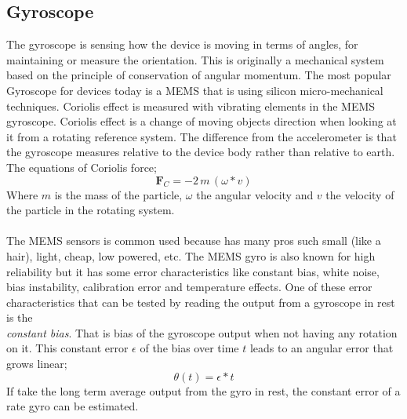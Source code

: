\subsection{Gyroscope}\label{sec:gyroscope}
The gyroscope is sensing how the device is moving in terms of angles, for maintaining or measure the orientation. This is originally  a mechanical system based on the principle of conservation of angular momentum. The most popular Gyroscope for devices today is a MEMS that is using silicon micro-mechanical techniques. Coriolis effect is measured with vibrating elements in the MEMS gyroscope. Coriolis effect is a change of moving objects direction when looking at it from a rotating reference system. The difference from the accelerometer is that the gyroscope measures relative to the device body rather than relative to earth. The equations of Coriolis force;  
$$\boldsymbol{ F}_C = -2 \, m \, (\omega *  v)$$
Where $m$ is the mass of the particle, $\omega$ the angular velocity and $v$ the velocity of the particle in the rotating system. 
\cite{sensor:inertialNav} \\
\\
The MEMS sensors is common used because has many pros such small (like a hair), light, cheap, low powered, etc. The MEMS gyro is also known for high reliability but it has some error characteristics like constant bias, white noise, bias instability, calibration error and temperature effects. One of these error characteristics that can be tested by reading the output from a gyroscope in rest is the \\\textit{constant bias}. That is bias of the gyroscope output when not having any rotation on it. This constant error $\epsilon$ of the bias over time $t$ leads to an angular error that grows linear; 
$$\theta (t)= \epsilon * t $$
If take the long term average output from the gyro in rest, the constant error of a rate gyro can be estimated.  


